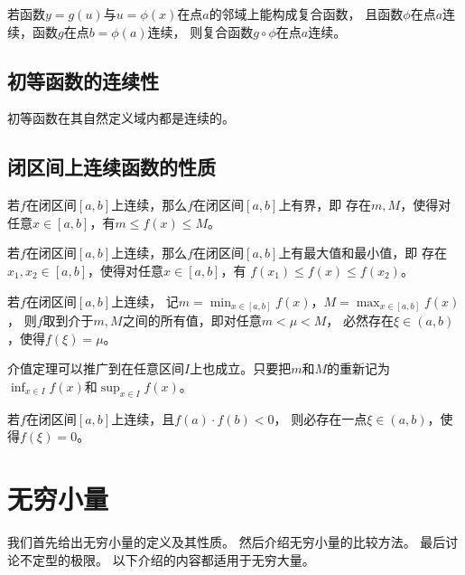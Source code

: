 \begin{theorem}[复合函数的连续性]
   若函数$y=g(u)$与$u=\phi(x)$在点$a$的邻域上能构成复合函数，
   且函数$\phi$在点$a$连续，函数$g$在点$b=\phi(a)$连续，
   则复合函数$g\circ\phi$在点$a$连续。
\end{theorem}

\subsection{初等函数的连续性}
\begin{theorem}[初等函数的连续性]
  初等函数在其自然定义域内都是连续的。
\end{theorem}

\subsection{闭区间上连续函数的性质}
\begin{theorem}[有界性定理] \label{thrm:continuous-func-bounded}
  若$f$在闭区间$[a,b]$上连续，那么$f$在闭区间$[a,b]$上有界，即
  存在$m,M$，使得对任意$x\in[a,b]$，有$m\le f(x)\le M$。
\end{theorem}

\begin{theorem}[最值定理]
  若$f$在闭区间$[a,b]$上连续，那么$f$在闭区间$[a,b]$上有最大值和最小值，即
  存在$x_1,x_2\in[a,b]$，使得对任意$x\in[a,b]$，有
  $f(x_1)\le f(x)\le f(x_2)$。
\end{theorem}

\begin{theorem}[介值定理]
  若$f$在闭区间$[a,b]$上连续，
  记$m=\min_{x\in[a,b]}f(x)$，$M=\max_{x\in[a,b]}f(x)$，
  则$f$取到介于$m,M$之间的所有值，即对任意$m<\mu<M$，
  必然存在$\xi\in(a,b)$，使得$f(\xi)=\mu$。
\end{theorem}
\begin{remark}
  介值定理可以推广到在任意区间$I$上也成立。只要把$m$和$M$的重新记为
  $\inf_{x\in I}f(x)$和$\sup_{x\in I}f(x)$。
\end{remark}

\begin{theorem}[零点定理]
  若$f$在闭区间$[a,b]$上连续，且$f(a)\cdot f(b) < 0$，
  则必存在一点$\xi\in(a,b)$，使得$f(\xi)=0$。
\end{theorem}

\section{无穷小量}
我们首先给出无穷小量的定义及其性质。
然后介绍无穷小量的比较方法。
最后讨论不定型的极限。
以下介绍的内容都适用于无穷大量。

